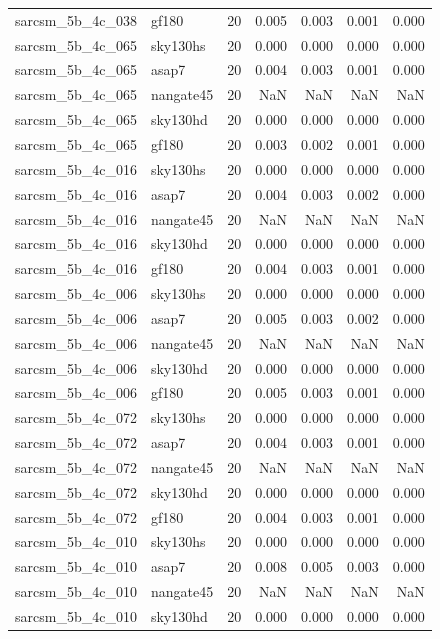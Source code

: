 \begin{tabular}{llrrrrr}
sarcsm\_5b\_4c\_038 & gf180 & 20 & 0.005 & 0.003 & 0.001 & 0.000 \\
sarcsm\_5b\_4c\_065 & sky130hs & 20 & 0.000 & 0.000 & 0.000 & 0.000 \\
sarcsm\_5b\_4c\_065 & asap7 & 20 & 0.004 & 0.003 & 0.001 & 0.000 \\
sarcsm\_5b\_4c\_065 & nangate45 & 20 & NaN & NaN & NaN & NaN \\
sarcsm\_5b\_4c\_065 & sky130hd & 20 & 0.000 & 0.000 & 0.000 & 0.000 \\
sarcsm\_5b\_4c\_065 & gf180 & 20 & 0.003 & 0.002 & 0.001 & 0.000 \\
sarcsm\_5b\_4c\_016 & sky130hs & 20 & 0.000 & 0.000 & 0.000 & 0.000 \\
sarcsm\_5b\_4c\_016 & asap7 & 20 & 0.004 & 0.003 & 0.002 & 0.000 \\
sarcsm\_5b\_4c\_016 & nangate45 & 20 & NaN & NaN & NaN & NaN \\
sarcsm\_5b\_4c\_016 & sky130hd & 20 & 0.000 & 0.000 & 0.000 & 0.000 \\
sarcsm\_5b\_4c\_016 & gf180 & 20 & 0.004 & 0.003 & 0.001 & 0.000 \\
sarcsm\_5b\_4c\_006 & sky130hs & 20 & 0.000 & 0.000 & 0.000 & 0.000 \\
sarcsm\_5b\_4c\_006 & asap7 & 20 & 0.005 & 0.003 & 0.002 & 0.000 \\
sarcsm\_5b\_4c\_006 & nangate45 & 20 & NaN & NaN & NaN & NaN \\
sarcsm\_5b\_4c\_006 & sky130hd & 20 & 0.000 & 0.000 & 0.000 & 0.000 \\
sarcsm\_5b\_4c\_006 & gf180 & 20 & 0.005 & 0.003 & 0.001 & 0.000 \\
sarcsm\_5b\_4c\_072 & sky130hs & 20 & 0.000 & 0.000 & 0.000 & 0.000 \\
sarcsm\_5b\_4c\_072 & asap7 & 20 & 0.004 & 0.003 & 0.001 & 0.000 \\
sarcsm\_5b\_4c\_072 & nangate45 & 20 & NaN & NaN & NaN & NaN \\
sarcsm\_5b\_4c\_072 & sky130hd & 20 & 0.000 & 0.000 & 0.000 & 0.000 \\
sarcsm\_5b\_4c\_072 & gf180 & 20 & 0.004 & 0.003 & 0.001 & 0.000 \\
sarcsm\_5b\_4c\_010 & sky130hs & 20 & 0.000 & 0.000 & 0.000 & 0.000 \\
sarcsm\_5b\_4c\_010 & asap7 & 20 & 0.008 & 0.005 & 0.003 & 0.000 \\
sarcsm\_5b\_4c\_010 & nangate45 & 20 & NaN & NaN & NaN & NaN \\
sarcsm\_5b\_4c\_010 & sky130hd & 20 & 0.000 & 0.000 & 0.000 & 0.000 \\

\end{tabular}
